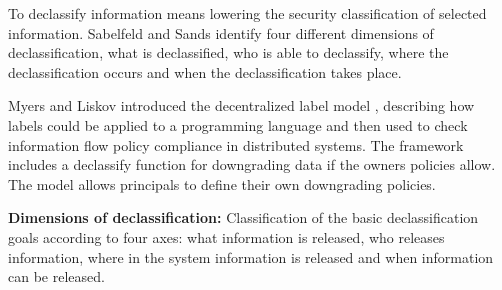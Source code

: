 To declassify information means lowering the security classification of selected information. Sabelfeld and Sands \cite{ref_3_sabelfeld2009declassification} identify four different dimensions of declassification, what is declassified, who is able to declassify, where the declassification occurs and when the declassification takes place.

Myers and Liskov introduced the decentralized label model \cite{ref_4_myers2000protecting}, describing how labels could be applied
to a programming language and then used to check information
flow policy compliance in distributed systems. The framework
includes a declassify function for downgrading data if the
owners policies allow. The model allows principals to define their own downgrading policies.

\textbf{Dimensions of declassification:}
Classification of the basic declassification goals according to four axes: what information is released, who releases information, where in the system information is released and when information can be released.

